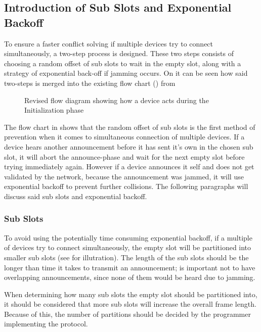 \subsection{Introduction of Sub Slots and Exponential Backoff} %
\label{sub:introduction_of_sub_slots_and_exponential_backoff}
To ensure a faster conflict solving if multiple devices try to connect simultaneously, a two-step process is designed.
These two steps consists of choosing a random offset of sub slots to wait in the empty slot, along with a strategy of exponential back-off if jamming occurs.
On  it can be seen how said two-steps is merged into the existing flow chart () from 

\begin{figure}[p]
    \centering \footnotesize
    
    \caption{Revised flow diagram showing how a device acts during the Initialization phase}
    \label{fig:pseudo_flowMultiConnect}
\end{figure}

The flow chart in  shows that the random offset of sub slots is the first method of prevention when it comes to simultaneous connection of multiple devices.
If a device hears another announcement before it has sent it's own in the chosen sub slot, it will abort the announce-phase and wait for the next empty slot before trying immediately again.
However if a device announces it self and does not get validated by the network, because the announcement was jammed, it will use exponential backoff to prevent further collisions.
The following paragraphs will discuss said sub slots and exponential backoff.

\subsubsection{Sub Slots} %
\label{ssub:sub_slots}
To avoid using the potentially time consuming exponential backoff, if a multiple of devices try to connect simultaneously, the empty slot will be partitioned into smaller sub slots (see  for illutration). 
The length of the sub slots should be the longer than time it takes to transmit an announcement; is important not to have overlapping announcements, since none of them would be heard due to jamming.

When determining how many sub slots the empty slot should be partitioned into, it should be considered that more sub slots will increase the overall frame length.
Because of this, the number of partitions should be decided by the programmer implementing the protocol.

